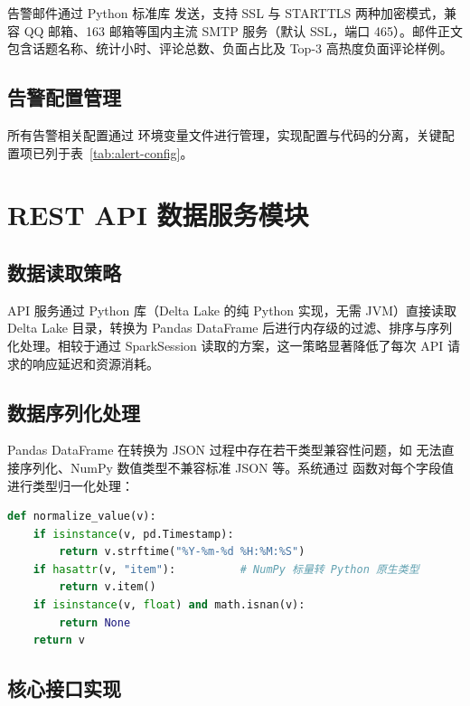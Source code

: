 告警邮件通过 Python 标准库  发送，支持 SSL 与 STARTTLS 两种加密模式，兼容 QQ 邮箱、163 邮箱等国内主流 SMTP 服务（默认 SSL，端口 465）。邮件正文包含话题名称、统计小时、评论总数、负面占比及 Top-3 高热度负面评论样例。

\subsection{告警配置管理}

所有告警相关配置通过  环境变量文件进行管理，实现配置与代码的分离，关键配置项已列于表~\ref{tab:alert-config}。

\section{REST API 数据服务模块}

\subsection{数据读取策略}

API 服务通过  Python 库（Delta Lake 的纯 Python 实现，无需 JVM）直接读取 Delta Lake 目录，转换为 Pandas DataFrame 后进行内存级的过滤、排序与序列化处理。相较于通过 SparkSession 读取的方案，这一策略显著降低了每次 API 请求的响应延迟和资源消耗。

\subsection{数据序列化处理}

Pandas DataFrame 在转换为 JSON 过程中存在若干类型兼容性问题，如  无法直接序列化、NumPy 数值类型不兼容标准 JSON 等。系统通过  函数对每个字段值进行类型归一化处理：

\begin{lstlisting}[language=Python, caption={数据序列化类型归一化}, label={lst:serial}]
def normalize_value(v):
    if isinstance(v, pd.Timestamp):
        return v.strftime("%Y-%m-%d %H:%M:%S")
    if hasattr(v, "item"):          # NumPy 标量转 Python 原生类型
        return v.item()
    if isinstance(v, float) and math.isnan(v):
        return None
    return v
\end{lstlisting}

\subsection{核心接口实现}

